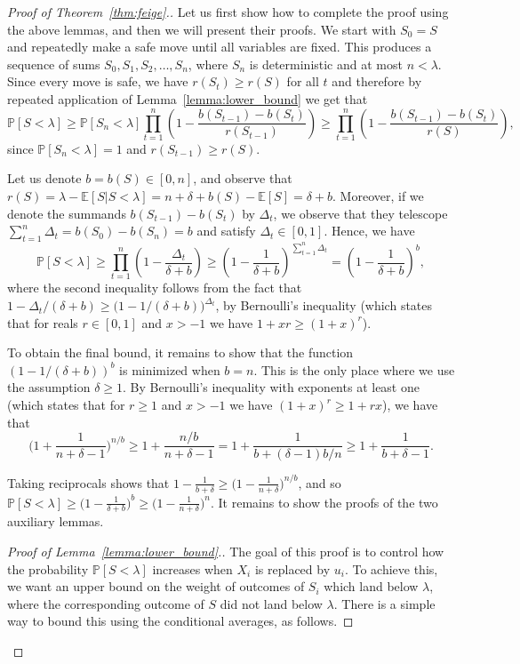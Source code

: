 \documentclass[10pt,a4paper]{article}
\newcommand{\bE}{\mathbb{E}}
\newcommand{\Pb}{\mathbb P}
\begin{document}
\begin{proof}[Proof of Theorem~\ref{thm:feige}.]
Let us first show how to complete the proof using the above lemmas, and then we will present their proofs. We start with $S_0=S$ and repeatedly make a safe move until all variables are fixed. This produces a sequence of sums $S_0, S_1, S_2, \dots, S_n$, where $S_n$ is deterministic and at most $n<\lambda$. Since every move is safe, we have $r(S_t)\geq r(S)$ for all $t$ and therefore by repeated application of Lemma~\ref{lemma:lower_bound} we get that
\vspace{-0.1cm}
\[\Pb[S<\lambda]\ge \Pb[S_n<\lambda] \prod_{t=1}^n\left(1-\frac{b(S_{t-1})-b(S_{t})}{r(S_{t-1})}\right)\geq \prod_{t=1}^n\left(1-\frac{b(S_{t-1})-b(S_{t})}{r(S)}\right),\]
since $\Pb[S_n<\lambda]=1$ and $r(S_{t-1})\geq r(S)$. 

Let us denote $b=b(S)\in [0, n]$, and observe that $r(S)=\lambda-\bE[S|S<\lambda]=n+\delta+b(S)-\bE[S]=\delta+b$. Moreover, if we denote the summands $b(S_{t-1})-b(S_t)$ by $\Delta_t$, we observe that they telescope $\sum_{t=1}^n\Delta_t=b(S_0)-b(S_n)=b$ and satisfy $\Delta_t\in [0, 1]$. Hence, we have
\vspace{-0.1cm}
\[\Pb[S<\lambda]\ge \prod_{t=1}^n\left(1-\frac{\Delta_t}{\delta+b}\right)\ge \left(1-\frac{1}{\delta+b}\right)^{\sum_{t=1}^{n}\Delta_t}=\left(1-\frac{1}{\delta+b}\right)^{b},\]
where the second inequality follows from the fact that $1-\Delta_t/(\delta+b)\geq \big(1-1/(\delta+b)\big)^{\Delta_t}$, by Bernoulli's inequality (which states that for reals $r\in [0, 1]$ and $x>-1$ we have $1+xr\geq (1+x)^r$).

To obtain the final bound, it remains to show that the function $(1-1/(\delta+b))^b$ is minimized when $b=n$. This is the only place where we use the assumption $\delta\geq 1$. By Bernoulli's inequality with exponents at least one (which states that for $r\geq 1$ and $x>-1$ we have $(1+x)^r\geq 1+rx$), we have that 
\vspace{-0.1cm}
\[\Big(1+\frac{1}{n+\delta-1}\Big)^{n/b}\geq 1+\frac{n/b}{n+\delta-1}= 1+\frac{1}{b+(\delta-1)b/n}\geq 1+\frac{1}{b+\delta-1}.\]
\vspace{-0.5cm}

\noindent
Taking reciprocals shows that $1-\frac{1}{b+\delta}\geq \big(1-\frac{1}{n+\delta}\big)^{n/b}$, and so $\Pb[S<\lambda]\geq \Big(1-\frac{1}{\delta+b}\Big)^{b}\geq \Big(1-\frac{1}{n+\delta}\Big)^n$. It remains to show the proofs of the two auxiliary lemmas.

\begin{proof}[Proof of Lemma~\ref{lemma:lower_bound}.]
The goal of this proof is to control how the probability $\Pb[S<\lambda]$ increases when $X_i$ is replaced by $u_i$. To achieve this, we want an upper bound on the weight of outcomes of $S_i$ which land below $\lambda$, where the corresponding outcome of $S$ did not land below $\lambda$. There is a simple way to bound this using the conditional averages, as follows. 


\end{proof}
\end{proof}
\end{document}
